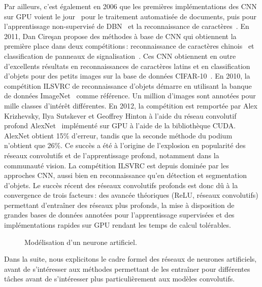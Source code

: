 Par ailleurs, c'est également en 2006 que les premières implémentations des \gls{CNN} sur \gls{GPU} voient le jour~\cite{chellapilla_high_2006} pour le traitement automatisée de documents, puis pour l'apprentissage non-supervisé de \gls{DBN}~\cite{raina_large-scale_2009} et la reconnaissance de caractères~\cite{ciresan_deep_2010}. En 2011, Dan Cire\c{s}an propose des méthodes à base de \gls{CNN} qui obtiennent la première place dans deux compétitions\,: reconnaissance de caractères chinois~\cite{liu_icdar_2011} et classification de panneaux de signalisation~\cite{stallkamp_german_2011}. Ces \gls{CNN} obtiennent en outre d'excellents résultats en reconnaissances de caractères latins et en classification d'objets pour des petits images sur la base de données CIFAR-10~\cite{ciresan_multi-column_2012}. En 2010, la compétition \gls{ILSVRC} de reconnaissance d'objets démarre en utilisant la banque de données ImageNet~\cite{deng_imagenet_2009} comme référence. Un million d'images sont annotées pour mille classes d'intérêt différentes. En 2012, la compétition est remportée par Alex Krizhevsky, Ilya Sutskever et Geoffrey Hinton à l'aide du réseau convolutif profond AlexNet~\cite{krizhevsky_imagenet_2012} implémenté sur \gls{GPU} à l'aide de la bibliothèque \gls{CUDA}. AlexNet obtient 15\% d'erreur, tandis que la seconde méthode du podium n'obtient que 26\%. Ce succès a été à l'origine de l'explosion en popularité des réseaux convolutifs et de l'apprentissage profond, notamment dans la communauté vision. La compétition \gls{ILSVRC} est depuis dominée par les approches \gls{CNN}, aussi bien en reconnaissance qu'en détection et segmentation d'objets. Le succès récent des réseaux convolutifs profonds est donc dû à la convergence de trois facteurs\,: des avancée théoriques (\gls{ReLU}, réseaux convolutifs) permettant d'entraîner des réseaux plus profonds, la mise à disposition de grandes bases de données annotées pour l'apprentissage supervisées et des implémentations rapides sur \gls{GPU} rendant les temps de calcul tolérables.

\begin{figure}[t]
  \resizebox{\textwidth}{!}{
  
  }
\caption{Modélisation d'un neurone artificiel.}
\label{fig:neurone}
\end{figure}

Dans la suite, nous explicitons le cadre formel des réseaux de neurones artificiels, avant de s'intéresser aux méthodes permettant de les entraîner pour différentes tâches avant de s'intéresser plus particulièrement aux modèles convolutifs.

